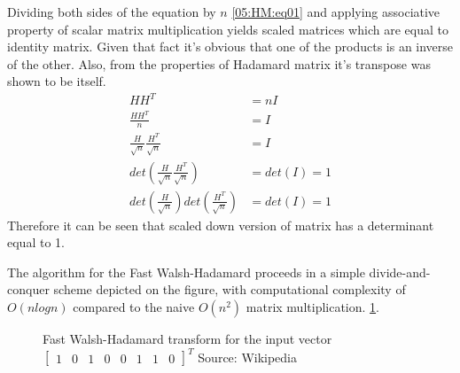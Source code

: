 Dividing both sides of the equation by $n$ \ref{05:HM:eq01} and applying associative property of scalar matrix multiplication yields scaled matrices which are equal to identity matrix. Given that fact it's obvious that one of the products is an inverse of the other. Also, from the properties of Hadamard matrix it's transpose was shown to be itself. 
\begin{align*}
    HH^{T} &= nI \\
    \frac{HH^{T}}{n} &= I \\
    \frac{H}{\sqrt{n}}\frac{H^{T}}{\sqrt{n}} &= I \\
    det(\frac{H}{\sqrt{n}}\frac{H^{T}}{\sqrt{n}}) &= det(I) = 1 \\
    det(\frac{H}{\sqrt{n}})det(\frac{H^{T}}{\sqrt{n}}) &= det(I) = 1
\end{align*}
Therefore it can be seen that scaled down version of matrix has a determinant equal to 1. 

The algorithm for the Fast Walsh-Hadamard proceeds in a simple divide-and-conquer scheme depicted on the figure, with computational complexity of $O(nlogn)$ compared to the naive $O(n^2)$ matrix multiplication.
\ref{05:fig:fast_WHT_figure}.
\begin{figure}[H]
\label{05:fig:fast_WHT_figure}
\centering

\caption{Fast Walsh-Hadamard transform for the input vector $\begin{bmatrix}
    1 & 0 & 1 & 0 & 0 & 1 & 1 & 0
\end{bmatrix}^T$ \newline Source: Wikipedia \cite{FastWalshTransform}}
\end{figure}



